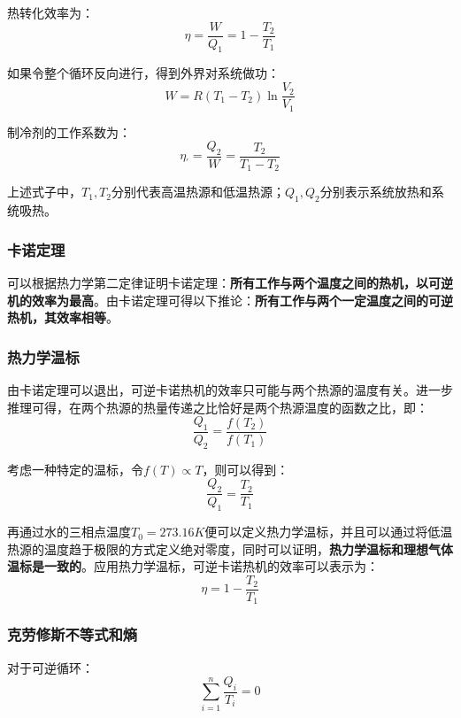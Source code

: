 \documentclass[UTF8]{ctexart}
\begin{document}
\noindent 热转化效率为：
\begin{equation}
\eta=\frac{W}{Q_{1}}=1-\frac{T_{2}}{T_{1}}
\end{equation}

	如果令整个循环反向进行，得到外界对系统做功：
	\begin{equation}
		W= R(T_{1}-T_{2}) \ln \frac{V_{2}}{V_{1}}
	\end{equation}
	
\noindent 制冷剂的工作系数为：
\begin{equation}
	\eta_{\prime}=\frac{Q_{2}}{W}=\frac{T_{2}}{T_{1}-T_{2}}
\end{equation}
	
	上述式子中，$ T_{1},T_{2} $分别代表高温热源和低温热源；$ Q_{1},Q_{2} $分别表示系统放热和系统吸热。
	
	\subsubsection{卡诺定理}
	可以根据热力学第二定律证明卡诺定理：\textbf{所有工作与两个温度之间的热机，以可逆机的效率为最高}。由卡诺定理可得以下推论：\textbf{所有工作与两个一定温度之间的可逆热机，其效率相等}。
	
	\subsubsection{热力学温标}
	由卡诺定理可以退出，可逆卡诺热机的效率只可能与两个热源的温度有关。进一步推理可得，在两个热源的热量传递之比恰好是两个热源温度的函数之比，即：
	\begin{equation}
		\frac{Q_{1}}{Q_{2}}=\frac{f(T_{2})}{f(T_{1})}
	\end{equation}
	
\noindent 考虑一种特定的温标，令$ f(T) \propto T $，则可以得到：
\begin{equation}
	\frac{Q_{2}}{Q_{1}} = \frac{T_{2}}{T_{1}}
\end{equation}

\noindent 再通过水的三相点温度$ T_{0} = 273.16K $便可以定义热力学温标，并且可以通过将低温热源的温度趋于极限的方式定义绝对零度，同时可以证明，\textbf{热力学温标和理想气体温标是一致的}。应用热力学温标，可逆卡诺热机的效率可以表示为：
\begin{equation}
	\eta =1-\frac{T_{2}}{T_{1}}
\end{equation}

	\subsubsection{克劳修斯不等式和熵}
	对于可逆循环：
	\begin{equation}
		\sum_{i=1}^{n} \frac{Q_{i}}{T_{i}}=0
	\end{equation}
	
\end{document}
